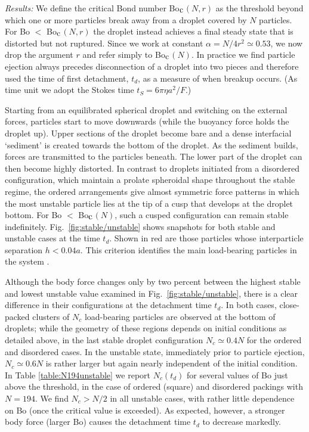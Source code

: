 \documentclass[aps,prl,superscriptaddress,twocolumn,showpacs,floatfix]{revtex4-1}
\newcommand{\Bocm}{Bo$_{\hbox{\rm c}}$}
\begin{document}
\textit{Results:}
We define the critical Bond number \Bocm $(N,r)$ as the threshold beyond which one or more particles break away from a droplet covered by $N$ particles. For Bo $<$ \Bocm $(N,r)$ the droplet instead achieves a final steady state that is distorted but not ruptured. Since we work at constant $\alpha = N/4r^2 \simeq 0.53$, we now drop the argument $r$ and refer simply to \Bocm $(N)$.
In practice we find particle ejection always precedes disconnection of a droplet into two pieces and therefore used the time of first detachment, $t_d$, as a measure of when breakup occurs. (As time unit we adopt the Stokes time $t_S =6\pi\eta a^2/F$.)

Starting from an equilibrated spherical droplet and switching on the external forces, particles start to move downwards (while the buoyancy force holds the droplet up). Upper sections of the droplet become bare \cite{fuller:2005/a,Joe} and a dense interfacial `sediment' is created towards the bottom of the droplet. As the sediment builds, forces are transmitted to the particles beneath. The lower part of the droplet can then become highly distorted. 
%
In contrast to droplets initiated from a disordered configuration, which maintain a prolate spheroidal shape throughout the stable regime, the ordered arrangements give almost symmetric force patterns in which the most unstable particle lies at the tip of a cusp that develops at the droplet bottom. For Bo $<$ \Bocm $(N)$, such a cusped configuration can remain stable indefinitely. Fig.~\ref{fig:stable/unstable} shows snapshots for both stable and unstable 
cases 
at the time $t_d$. Shown in red are those particles whose interparticle separation $h<0.04 a$. This criterion identifies the main load-bearing particles in the system \cite{supmat}.

Although the body force changes only by two percent between the highest stable and lowest unstable value examined in Fig.~\ref{fig:stable/unstable}, there is a clear difference in their configurations at the detachment time $t_d$. In both cases, 
close-packed clusters of $N_c$ load-bearing particles are observed at the bottom of droplets; while the geometry of these regions depends on initial conditions as detailed above, in the last stable droplet configuration  $N_c\simeq 0.4N$ for the ordered and disordered cases. In the unstable state, immediately prior to particle ejection, $N_c\simeq 0.6N$ is rather larger but again nearly independent of the initial condition.
In Table \ref{table:N194unstable}
we report $N_{c}(t_d)$ for several values of Bo just above the threshold, in the case of ordered (square) and disordered packings with $N=194$.  We find $N_{c}>N/2$ in all unstable cases, with rather little dependence on Bo (once the critical value is exceeded). As expected, however, a stronger body force (larger Bo) causes the detachment time $t_d$ to decrease markedly. 
\end{document}
